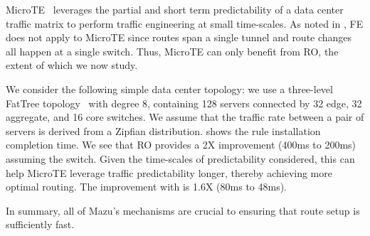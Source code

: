 MicroTE~\cite{microte} leverages the partial and short term
predictability of a data center traffic matrix to perform traffic engineering
at small time-scales. As noted in , FE does not apply to
MicroTE since routes span a single tunnel and route changes all happen at a
single switch. Thus, MicroTE can only benefit from RO, the extent of which we
now study.







We consider the following simple data center topology: we use a three-level FatTree topology~\cite{fattree-sigcomm08} with degree 8, containing 128 servers connected by 32 edge, 32 aggregate, and 16 core switches.
We
assume that the traffic rate between a pair of servers is derived from a
Zipfian distribution.  shows the rule installation
completion time. We see that RO provides a 2X improvement (400ms to 200ms)
assuming the \BroadcomOne switch. Given the time-scales of predictability
considered, this can help MicroTE leverage traffic predictability longer,
thereby achieving more optimal routing. The improvement with \Intel is 1.6X
(80ms to 48ms).


\begin{figure}[!tb]
\centering
{}
\vspace{-1em}
\label{microteResults}
\end{figure}

In summary, all of Mazu's mechanisms are crucial to ensuring that route
setup is sufficiently fast.

